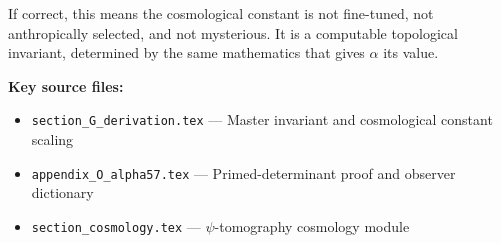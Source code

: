 \documentclass[11pt]{article}
\begin{document}
If correct, this means the cosmological constant is not fine-tuned, not anthropically
selected, and not mysterious. It is a computable topological invariant, determined by the
same mathematics that gives $\alpha$ its value.

\bigskip
\noindent\textbf{Key source files:}
\begin{itemize}
\item \texttt{section\_G\_derivation.tex} --- Master invariant and cosmological constant scaling
\item \texttt{appendix\_O\_alpha57.tex} --- Primed-determinant proof and observer dictionary
\item \texttt{section\_cosmology.tex} --- $\psi$-tomography cosmology module
\end{itemize}
\end{document}
